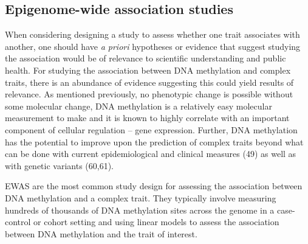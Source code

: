 \documentclass[11pt,oneside]{bristolthesis}
\begin{document}
\hypertarget{ewas}{%
\subsection{Epigenome-wide association studies}\label{ewas}}

When considering designing a study to assess whether one trait associates with another, one should have \emph{a priori} hypotheses or evidence that suggest studying the association would be of relevance to scientific understanding and public health. For studying the association between DNA methylation and complex traits, there is an abundance of evidence suggesting this could yield results of relevance. As mentioned previously, no phenotypic change is possible without some molecular change, DNA methylation is a relatively easy molecular measurement to make and it is known to highly correlate with an important component of cellular regulation -- gene expression. Further, DNA methylation has the potential to improve upon the prediction of complex traits beyond what can be done with current epidemiological and clinical measures (49) as well as with genetic variants (60,61).

EWAS are the most common study design for assessing the association between DNA methylation and a complex trait. They typically involve measuring hundreds of thousands of DNA methylation sites across the genome in a case-control or cohort setting and using linear models to assess the association between DNA methylation and the trait of interest.
\end{document}
